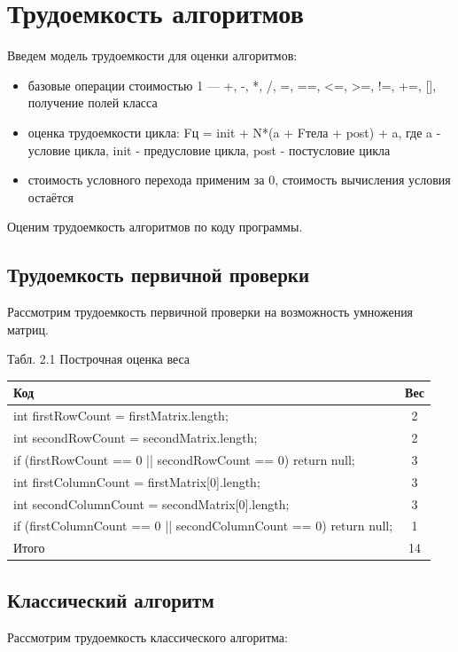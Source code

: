 \documentclass[12pt]{report}
\begin{document}
\newpage
\section{Трудоемкость алгоритмов}
Введем модель трудоемкости для оценки алгоритмов: 
\begin{itemize}
	\item базовые операции стоимостью 1 — +, -, *, /, =, ==, <=, >=, !=, +=, [], получение полей класса
	\item оценка трудоемкости цикла: Fц = init +  N*(a + Fтела + post) + a, где a - условие цикла, init - предусловие цикла, post - постусловие цикла
	\item стоимость условного перехода применим за 0, стоимость вычисления условия остаётся
\end{itemize}

Оценим трудоемкость алгоритмов по коду программы.

\subsection{Трудоемкость первичной проверки}
Рассмотрим трудоемкость первичной проверки на возможность умножения матриц.

\begin{center}
Табл. 2.1 Построчная оценка веса
	\begin{tabular}{|l c|} 
 	\hline
	Код & Вес \\ [0.5ex] 
 	\hline\hline
 	int firstRowCount = firstMatrix.length; & 2\\
 	\hline
	int secondRowCount = secondMatrix.length; & 2\\
	\hline
	if (firstRowCount == 0 || secondRowCount == 0) return null; & 3\\
	\hline
	int firstColumnCount = firstMatrix[0].length; & 3\\
	\hline
	int secondColumnCount = secondMatrix[0].length; & 3\\
	\hline
	if (firstColumnCount == 0 || secondColumnCount == 0) return null; & 1\\
	\hline\hline
	Итого & 14\\
	\hline
	\end{tabular}
\end{center}

\subsection{Классический алгоритм}
Рассмотрим трудоемкость классического алгоритма:  
\end{document}
